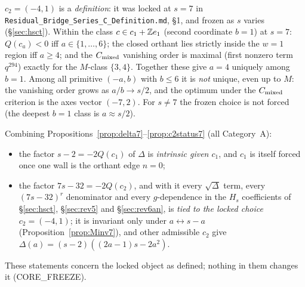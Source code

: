 \begin{proposition}[Status of $c_2=(-4,1)$ \src{37}, \S5(c), \S6.2]\label{prop:c2status7}
$c_2=(-4,1)$ is a \emph{definition}: it was locked at $s=7$ in \textup{\texttt{Residual\_Bridge\_Series\_C\_Definition.md}}, \S1, and frozen as $s$ varies (\S\ref{sec:hsct}). Within the class $c\in c_1+\mathbb{Z} e_1$ (second coordinate $b=1$) at $s=7$: $Q(c_a)<0$ iff $a\in\{1,\dots,6\}$; the closed orthant lies strictly inside the $w=1$ region iff $a\ge4$; and the $C_{\mathrm{mixed}}$ vanishing order is maximal (first nonzero term $q^{294}$) exactly for the $M$-class $\{3,4\}$. Together these give $a=4$ uniquely among $b=1$. Among all primitive $(-a,b)$ with $b\le6$ it is \emph{not} unique, even up to $M$: the vanishing order grows as $a/b\to s/2$, and the optimum under the $C_{\mathrm{mixed}}$ criterion is the axes vector $(-7,2)$. For $s\ne7$ the frozen choice is not forced (the deepest $b=1$ class is $a\approx s/2$).
\end{proposition}
\begin{remark}\label{rem:intrinsic7}
Combining Propositions~\ref{prop:delta7}--\ref{prop:c2status7} (all Category~A):
\begin{itemize}[leftmargin=2em]
\item the factor $s-2=-2Q(c_1)$ of $\Delta$ is \emph{intrinsic given $c_1$}, and $c_1$ is itself forced once one wall is the orthant edge $n=0$;
\item the factor $7s-32=-2Q(c_2)$, and with it every $\sqrt\Delta$ term, every $(7s-32)^r$ denominator and every $g$-dependence in the $H_s$ coefficients of \S\ref{sec:hsct}, \S\ref{sec:rev5} and \S\ref{sec:rev6an}, is \emph{tied to the locked choice} $c_2=(-4,1)$; it is invariant only under $a\leftrightarrow s-a$ (Proposition~\ref{prop:Minv7}), and other admissible $c_2$ give $\Delta(a)=(s-2)((2a-1)s-2a^2)$.
\end{itemize}
These statements concern the locked object as defined; nothing in them changes it (CORE\_FREEZE).
\end{remark}

